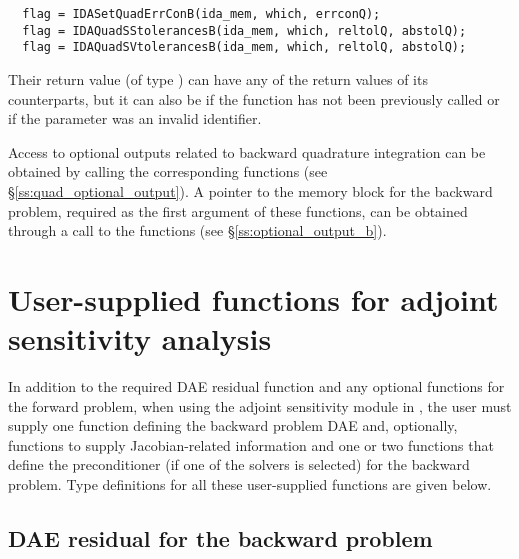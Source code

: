 \begin{verbatim}
  flag = IDASetQuadErrConB(ida_mem, which, errconQ);
  flag = IDAQuadSStolerancesB(ida_mem, which, reltolQ, abstolQ);
  flag = IDAQuadSVtolerancesB(ida_mem, which, reltolQ, abstolQ);
\end{verbatim}
Their return value  (of type ) can have any of the return values 
of its counterparts, but it can also be  if the function 
 has not been previously called or  if the
parameter  was an invalid identifier.

Access to optional outputs related to backward quadrature integration
can be obtained by calling the corresponding 
functions (see \S\ref{ss:quad_optional_output}).  A pointer
 to the {\idas} memory block for the backward problem,
required as the first argument of these functions, can be obtained
through a call to the functions  (see
\S\ref{ss:optional_output_b}).



\section{User-supplied functions for adjoint sensitivity analysis}
\label{ss:user_fct_adj}

In addition to the required DAE residual function and any optional functions
for the forward problem, when using the adjoint sensitivity module in {\idas},
the user must supply one function defining the backward problem DAE and, optionally,
functions to supply Jacobian-related information and one or two functions 
that define the preconditioner (if one of the {\idaspils} solvers is
selected) for the backward problem.
Type definitions for all these user-supplied functions are given below.

\subsection{DAE residual for the backward problem}\label{ss:DAEres_b}

